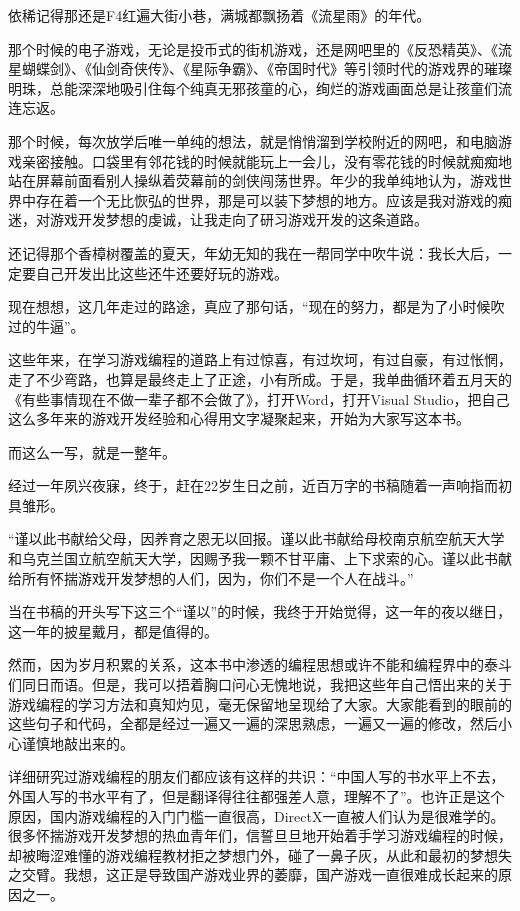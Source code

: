 \documentclass[
  paper=a4,
  ,captions=tableheading
]{scrartcl}
\begin{document}
依稀记得那还是F4红遍大街小巷，满城都飘扬着《流星雨》的年代。

那个时候的电子游戏，无论是投币式的街机游戏，还是网吧里的《反恐精英》、《流星蝴蝶剑》、《仙剑奇侠传》、《星际争霸》、《帝国时代》等引领时代的游戏界的璀璨明珠，总能深深地吸引住每个纯真无邪孩童的心，绚烂的游戏画面总是让孩童们流连忘返。

那个时候，每次放学后唯一单纯的想法，就是悄悄溜到学校附近的网吧，和电脑游戏亲密接触。口袋里有邻花钱的时候就能玩上一会儿，没有零花钱的时候就痴痴地站在屏幕前面看别人操纵着荧幕前的剑侠闯荡世界。年少的我单纯地认为，游戏世界中存在着一个无比恢弘的世界，那是可以装下梦想的地方。应该是我对游戏的痴迷，对游戏开发梦想的虔诚，让我走向了研习游戏开发的这条道路。

还记得那个香樟树覆盖的夏天，年幼无知的我在一帮同学中吹牛说：我长大后，一定要自己开发出比这些还牛还要好玩的游戏。

现在想想，这几年走过的路途，真应了那句话，``现在的努力，都是为了小时候吹过的牛逼''。

这些年来，在学习游戏编程的道路上有过惊喜，有过坎坷，有过自豪，有过怅惘，走了不少弯路，也算是最终走上了正途，小有所成。于是，我单曲循环着五月天的《有些事情现在不做一辈子都不会做了》，打开Word，打开Visual
Studio，把自己这么多年来的游戏开发经验和心得用文字凝聚起来，开始为大家写这本书。

而这么一写，就是一整年。

经过一年夙兴夜寐，终于，赶在22岁生日之前，近百万字的书稿随着一声响指而初具雏形。

``谨以此书献给父母，因养育之恩无以回报。谨以此书献给母校南京航空航天大学和乌克兰国立航空航天大学，因赐予我一颗不甘平庸、上下求索的心。谨以此书献给所有怀揣游戏开发梦想的人们，因为，你们不是一个人在战斗。''

当在书稿的开头写下这三个``谨以''的时候，我终于开始觉得，这一年的夜以继日，这一年的披星戴月，都是值得的。

然而，因为岁月积累的关系，这本书中渗透的编程思想或许不能和编程界中的泰斗们同日而语。但是，我可以捂着胸口问心无愧地说，我把这些年自己悟出来的关于游戏编程的学习方法和真知灼见，毫无保留地呈现给了大家。大家能看到的眼前的这些句子和代码，全都是经过一遍又一遍的深思熟虑，一遍又一遍的修改，然后小心谨慎地敲出来的。

详细研究过游戏编程的朋友们都应该有这样的共识：``中国人写的书水平上不去，外国人写的书水平有了，但是翻译得往往都强差人意，理解不了''。也许正是这个原因，国内游戏编程的入门门槛一直很高，DirectX一直被人们认为是很难学的。很多怀揣游戏开发梦想的热血青年们，信誓旦旦地开始着手学习游戏编程的时候，却被晦涩难懂的游戏编程教材拒之梦想门外，碰了一鼻子灰，从此和最初的梦想失之交臂。我想，这正是导致国产游戏业界的萎靡，国产游戏一直很难成长起来的原因之一。
\end{document}
